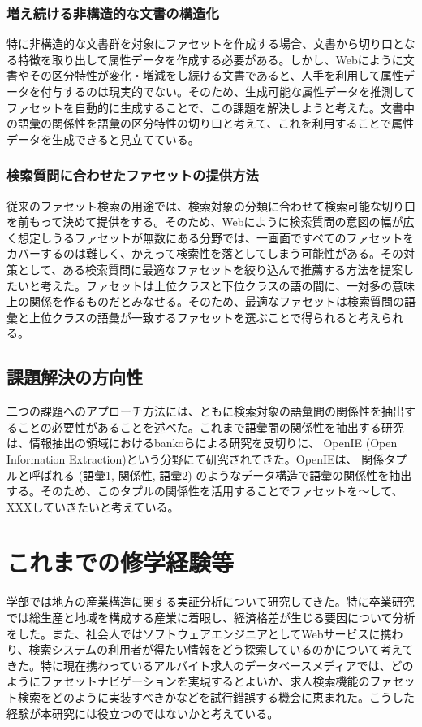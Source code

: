 \documentclass[a4j,10pt, twocolumn]{jarticle}
\begin{document}
\subsubsection{増え続ける非構造的な文書の構造化}
 特に非構造的な文書群を対象にファセットを作成する場合、文書から切り口となる特徴を取り出して属性データを作成する必要がある。しかし、Webにように文書やその区分特性が変化・増減をし続ける文書であると、人手を利用して属性データを付与するのは現実的でない。そのため、生成可能な属性データを推測してファセットを自動的に生成することで、この課題を解決しようと考えた。文書中の語彙の関係性を語彙の区分特性の切り口と考えて、これを利用することで属性データを生成できると見立てている。
\subsubsection{検索質問に合わせたファセットの提供方法}
従来のファセット検索の用途では、検索対象の分類に合わせて検索可能な切り口を前もって決めて提供をする。そのため、Webにように検索質問の意図の幅が広く想定しうるファセットが無数にある分野では、一画面ですべてのファセットをカバーするのは難しく、かえって検索性を落としてしまう可能性がある。その対策として、ある検索質問に最適なファセットを絞り込んで推薦する方法を提案したいと考えた。ファセットは上位クラスと下位クラスの語の間に、一対多の意味上の関係を作るものだとみなせる。そのため、最適なファセットは検索質問の語彙と上位クラスの語彙が一致するファセットを選ぶことで得られると考えられる。

\subsection{課題解決の方向性}
二つの課題へのアプローチ方法には、ともに検索対象の語彙間の関係性を抽出することの必要性があることを述べた。これまで語彙間の関係性を抽出する研究は、情報抽出の領域におけるbankoらによる研究\cite{banko}を皮切りに、 OpenIE (Open Information Extraction)という分野にて研究されてきた\cite{niklaus}。OpenIEは、 関係タプルと呼ばれる (語彙1, 関係性, 語彙2) のようなデータ構造で語彙の関係性を抽出する。そのため、このタプルの関係性を活用することでファセットを〜して、XXXしていきたいと考えている。

\section{これまでの修学経験等}
 学部では地方の産業構造に関する実証分析について研究してきた。特に卒業研究では総生産と地域を構成する産業に着眼し、経済格差が生じる要因について分析をした。また、社会人ではソフトウェアエンジニアとしてWebサービスに携わり、検索システムの利用者が得たい情報をどう探索しているのかについて考えてきた。特に現在携わっているアルバイト求人のデータベースメディアでは、どのようにファセットナビゲーションを実現するとよいか、求人検索機能のファセット検索をどのように実装すべきかなどを試行錯誤する機会に恵まれた。こうした経験が本研究には役立つのではないかと考えている。
\end{document}
